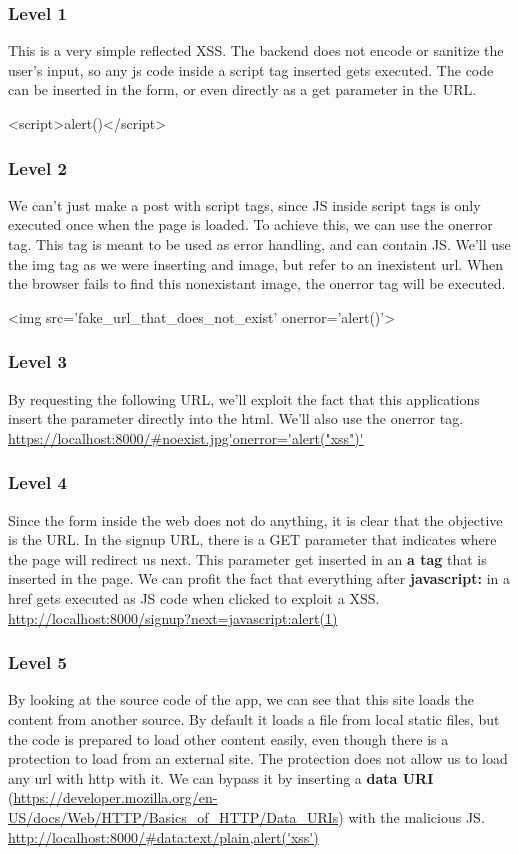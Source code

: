 \begin{Answer}[ref={websec-xss-game}]
	\subsubsection{Level 1}
	This is a very simple reflected XSS. The backend does not encode or sanitize the user's input, so any js code inside a script tag inserted gets executed. The code can be inserted in the form, or even directly as a get parameter in the URL.
  \begin{html}
<script>alert()</script>
\end{html}
	\subsubsection{Level 2}
	We can't just make a post with script tags, since JS inside script tags is only executed once when the page is loaded. To achieve this, we can use the onerror tag. This tag is meant to be used as error handling, and can contain JS. We'll use the img tag as we were inserting and image, but refer to an inexistent url. When the browser fails to find this nonexistant image, the onerror tag will be executed.
\begin{html}
<img src='fake_url_that_does_not_exist' onerror='alert()'>
\end{html}
	\subsubsection{Level 3}
	By requesting the following URL, we'll exploit the fact that this applications insert the parameter directly into the html. We'll also use the onerror tag.
\url{https://localhost:8000/#noexist.jpg'onerror='alert("xss")'}
	\subsubsection{Level 4}
	Since the form inside the web does not do anything, it is clear that the objective is the URL. In the signup URL, there is a GET parameter that indicates where the page will redirect us next. This parameter get inserted in an \textbf{a tag} that is inserted in the page. We can profit the fact that everything after \textbf{javascript:} in a href gets executed as JS code when clicked to exploit a XSS.
\url{http://localhost:8000/signup?next=javascript:alert(1)}
	\subsubsection{Level 5}
	By looking at the source code of the app, we can see that this site loads the content from another source. By default it loads a file from local static files, but the code is prepared to load other content easily, even though there is a protection to load from an external site. The protection does not allow us to load any url with http with it. We can bypass it by inserting a \textbf{data URI} (\url{https://developer.mozilla.org/en-US/docs/Web/HTTP/Basics_of_HTTP/Data_URIs})  with the malicious JS.
\url{http://localhost:8000/#data:text/plain,alert('xss')}
\end{Answer}